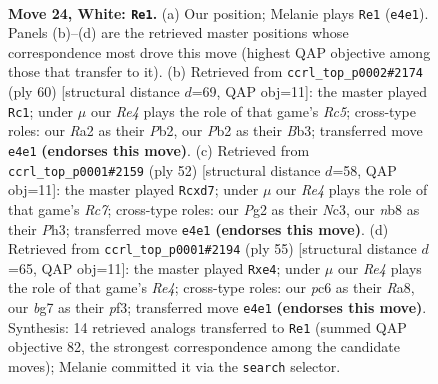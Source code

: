 \documentclass[11pt]{article}
\begin{document}
\clearpage

\begin{figure}[p]\centering
\begin{subfigure}{0.46\textwidth}\centering
\resizebox{\linewidth}{!}{%
\newchessgame
\chessboard[
  setfen={rn6/5kb1/2p5/4p1B1/p3R2p/P7/RPP2PPP/1N1r1K2 w - - 2 24},
  showmover=false,
  pgfstyle=straightmove, color=movearrow, markmove={e4-e1}
]}
\caption{}
\end{subfigure}\hfill
\begin{subfigure}{0.46\textwidth}\centering
\resizebox{\linewidth}{!}{%
\newchessgame
\chessboard[
  setfen={r2n1k2/3b4/2p2ppp/1pR1p3/1N2P2P/1B3P2/PP3KP1/8 w - - 2 31},
  showmover=false,
  pgfstyle=straightmove, color=movearrow, markmove={c5-c1}
]}
\caption{}
\end{subfigure}
\\[4pt]
\begin{subfigure}{0.46\textwidth}\centering
\resizebox{\linewidth}{!}{%
\newchessgame
\chessboard[
  setfen={3r2k1/p1RbR1pp/2p5/5p2/2P2p2/2N4P/P4PPK/2r5 w - - 12 27},
  showmover=false,
  pgfstyle=straightmove, color=movearrow, markmove={c7-d7}
]}
\caption{}
\end{subfigure}\hfill
\begin{subfigure}{0.46\textwidth}\centering
\resizebox{\linewidth}{!}{%
\newchessgame
\chessboard[
  setfen={r5k1/4bp1p/3p2p1/1p2r1P1/4Rp1P/P4P2/1PB5/1K5R b - - 1 28},
  showmover=false,
  pgfstyle=straightmove, color=movearrow, markmove={e5-e4}
]}
\caption{}
\end{subfigure}
\caption{\textbf{Move 24, White: \texttt{Re1}.} (a) Our position; Melanie plays \texttt{Re1} (\texttt{e4e1}). Panels (b)--(d) are the retrieved master positions whose correspondence most drove this move (highest QAP objective among those that transfer to it). (b) Retrieved from \texttt{ccrl\_top\_p0002\#2174} (ply 60) [structural distance $d$=69, QAP obj=11]: the master played \texttt{Rc1}; under $\mu$ our \emph{Re4} plays the role of that game's \emph{Rc5}; cross-type roles: our \emph{R}a2 as their \emph{P}b2, our \emph{P}b2 as their \emph{B}b3; transferred move \texttt{e4e1} \textbf{(endorses this move)}. (c) Retrieved from \texttt{ccrl\_top\_p0001\#2159} (ply 52) [structural distance $d$=58, QAP obj=11]: the master played \texttt{Rcxd7}; under $\mu$ our \emph{Re4} plays the role of that game's \emph{Rc7}; cross-type roles: our \emph{P}g2 as their \emph{N}c3, our \emph{n}b8 as their \emph{P}h3; transferred move \texttt{e4e1} \textbf{(endorses this move)}. (d) Retrieved from \texttt{ccrl\_top\_p0001\#2194} (ply 55) [structural distance $d$=65, QAP obj=11]: the master played \texttt{Rxe4}; under $\mu$ our \emph{Re4} plays the role of that game's \emph{Re4}; cross-type roles: our \emph{p}c6 as their \emph{R}a8, our \emph{b}g7 as their \emph{p}f3; transferred move \texttt{e4e1} \textbf{(endorses this move)}. Synthesis: 14 retrieved analogs transferred to \texttt{Re1} (summed QAP objective 82, the strongest correspondence among the candidate moves); Melanie committed it via the \texttt{search} selector.}
\label{fig:thought-m46}
\end{figure}
\end{document}
